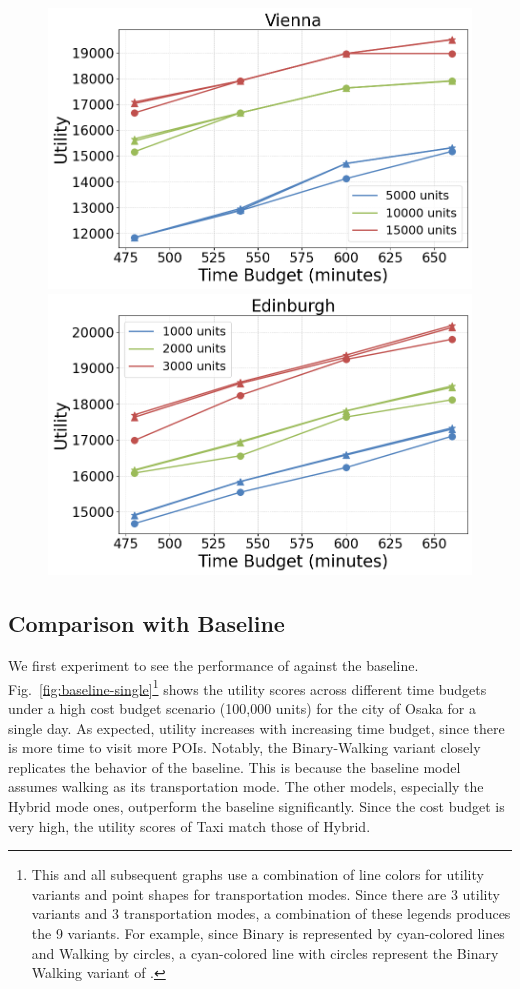\begin{figure}[t]
    \includegraphics[width=0.65\columnwidth]{plots/exp1-vienna.png}
    \includegraphics[width=0.65\columnwidth]{plots/exp1-edinburgh.png}
    \label{fig:cities}
\end{figure}

\subsection{Comparison with Baseline}
\label{sec:exp baseline comparison}

We first experiment to see the performance of \trip against the baseline.
Fig.~\ref{fig:baseline-single}\footnote{This and all subsequent graphs use a combination of line colors for utility variants and point shapes for transportation modes. Since there are 3 utility variants and 3 transportation modes, a combination of these legends produces the 9 \trip variants. For example, since Binary is represented by cyan-colored lines and Walking by circles, a cyan-colored line with circles represent the Binary Walking variant of \trip.}
shows the utility scores across different time budgets under a high cost budget scenario (100,000 units) for the city of Osaka for a single day.
As expected, utility increases with increasing time budget, since there is more time to visit more POIs.
Notably, the \trip Binary-Walking variant closely replicates the behavior of the baseline. This is because the baseline model assumes walking as its transportation mode.  The other models, especially the Hybrid mode ones, outperform the baseline significantly.
Since the cost budget is very high, the utility scores of Taxi match those of Hybrid.

